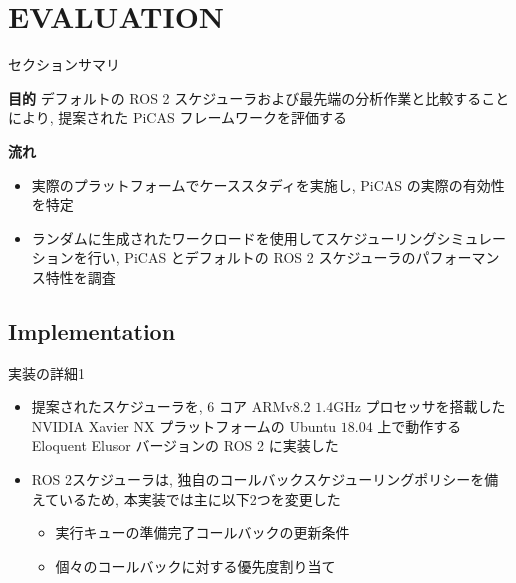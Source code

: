 
\section{EVALUATION}
\label{sec: evaluation}

\begin{frame}{セクションサマリ}
    \begin{itembox}[l]{\textbf{目的}}
        デフォルトの ROS 2 スケジューラおよび最先端の分析作業と比較することにより, 提案された PiCAS フレームワークを評価する
    \end{itembox}
    \begin{itembox}[l]{\textbf{流れ}}
        \begin{itemize}
            \item 実際のプラットフォームでケーススタディを実施し, PiCAS の実際の有効性を特定
            \item ランダムに生成されたワークロードを使用してスケジューリングシミュレーションを行い, PiCAS とデフォルトの ROS 2 スケジューラのパフォーマンス特性を調査
        \end{itemize}
    \end{itembox}
\end{frame}


\subsection{Implementation}
\label{ssec: implementation}

\begin{frame}{実装の詳細1}
    \begin{itemize}
        \item 提案されたスケジューラを, 6 コア ARMv8.2 $1.4 \mathrm{GHz}$ プロセッサを搭載した NVIDIA Xavier NX プラットフォームの Ubuntu $18.04$ 上で動作する Eloquent Elusor バージョンの ROS 2 に実装した
        \item ROS 2スケジューラは, 独自のコールバックスケジューリングポリシーを備えているため, 本実装では主に以下2つを変更した
              \begin{itemize}
                  \item 実行キューの準備完了コールバックの更新条件
                  \item 個々のコールバックに対する優先度割り当て
              \end{itemize}
    \end{itemize}
\end{frame}

